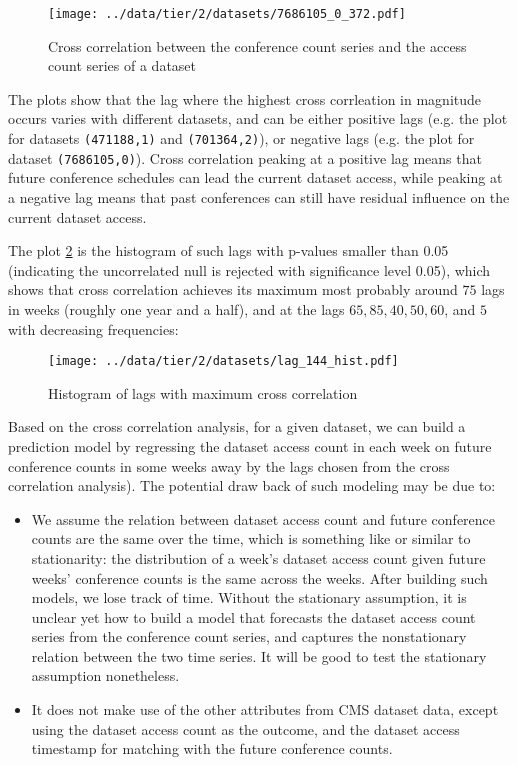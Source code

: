 \documentclass[final, 12pt]{elsarticle}
\begin{document}
\begin{figure}
\begin{center}
\texttt{[image: ../data/tier/2/datasets/7686105\_0\_372.pdf]}
\end{center}
\caption{Cross correlation between the conference count series and the access count series of a dataset}
\label{cor3}
\end{figure}


The plots show that the lag where the highest cross corrleation in magnitude occurs varies with different datasets, and can be either positive lags (e.g. the plot for datasets \verb|(471188,1)| and \verb|(701364,2)|), or negative lags (e.g. the plot for dataset \verb|(7686105,0)|).
Cross correlation peaking at a positive lag means that future conference schedules can lead the current dataset access, while peaking at a negative lag means that past conferences can still have residual influence on the current dataset access.


The plot \ref{laghist} is the histogram of such lags with p-values smaller than 0.05 (indicating the uncorrelated null is rejected with significance level 0.05), which shows that cross correlation achieves its maximum most probably around $75$ lags in weeks (roughly one year and a half), and at the lags  $65, 85, 40, 50, 60$, and $5$ with decreasing frequencies:
 
\begin{figure}
\begin{center}
\texttt{[image: ../data/tier/2/datasets/lag\_144\_hist.pdf]}
\end{center}
\caption{Histogram of lags with maximum cross correlation}
\label{laghist}
\end{figure}

Based on the cross correlation analysis, for a given dataset, we can build a prediction model  by regressing the dataset access count in each week on future conference counts in some weeks away by the lags chosen from the cross correlation analysis).
The potential draw back of such modeling may be due to:

\begin{itemize}
  
\item We assume the relation between dataset access count and future conference counts are the same over the time, which is something like or similar to stationarity: the distribution of a week's dataset access count given future weeks' conference counts is the same across the weeks. After building such models, we lose track of time.
Without the stationary assumption, it is unclear yet how to build a model that forecasts the dataset access count series from the conference count series, and captures the nonstationary relation between the two time series.
It will be good to test the stationary assumption nonetheless.

\item It does not make use of the other attributes from CMS dataset data, except using the dataset access count as the outcome, and the dataset access timestamp for matching with the future conference counts.

\end{itemize}
\end{document}
